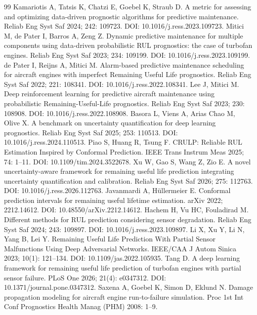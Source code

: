 \begin{thebibliography}{99}
\small
\setlength{\itemsep}{0pt}
 Kamariotis A, Tatsis K, Chatzi E, Goebel K, Straub D. A metric for assessing and optimizing data-driven prognostic algorithms for predictive maintenance. Reliab Eng Syst Saf 2024; 242: 109723. DOI: 10.1016/j.ress.2023.109723.
 Mitici M, de Pater I, Barros A, Zeng Z. Dynamic predictive maintenance for multiple components using data-driven probabilistic RUL prognostics: the case of turbofan engines. Reliab Eng Syst Saf 2023; 234: 109199. DOI: 10.1016/j.ress.2023.109199.
 de Pater I, Reijns A, Mitici M. Alarm-based predictive maintenance scheduling for aircraft engines with imperfect Remaining Useful Life prognostics. Reliab Eng Syst Saf 2022; 221: 108341. DOI: 10.1016/j.ress.2022.108341.
 Lee J, Mitici M. Deep reinforcement learning for predictive aircraft maintenance using probabilistic Remaining-Useful-Life prognostics. Reliab Eng Syst Saf 2023; 230: 108908. DOI: 10.1016/j.ress.2022.108908.
 Basora L, Viens A, Arias Chao M, Olive X. A benchmark on uncertainty quantification for deep learning prognostics. Reliab Eng Syst Saf 2025; 253: 110513. DOI: 10.1016/j.ress.2024.110513.
 Piao S, Huang R, Tsung F. CRULP: Reliable RUL Estimation Inspired by Conformal Prediction. IEEE Trans Instrum Meas 2025; 74: 1--11. DOI: 10.1109/tim.2024.3522678.
 Xu W, Gao S, Wang Z, Zio E. A novel uncertainty-aware framework for remaining useful life prediction integrating uncertainty quantification and calibration. Reliab Eng Syst Saf 2026; 275: 112763. DOI: 10.1016/j.ress.2026.112763.
 Javanmardi A, H\"ullermeier E. Conformal prediction intervals for remaining useful lifetime estimation. arXiv 2022; 2212.14612. DOI: 10.48550/arXiv.2212.14612.
 Hachem H, Vu HC, Fouladirad M. Different methods for RUL prediction considering sensor degradation. Reliab Eng Syst Saf 2024; 243: 109897. DOI: 10.1016/j.ress.2023.109897.
 Li X, Xu Y, Li N, Yang B, Lei Y. Remaining Useful Life Prediction With Partial Sensor Malfunctions Using Deep Adversarial Networks. IEEE/CAA J Autom Sinica 2023; 10(1): 121--134. DOI: 10.1109/jas.2022.105935.
 Tang D. A deep learning framework for remaining useful life prediction of turbofan engines with partial sensor failure. PLoS One 2026; 21(4): e0347312. DOI: 10.1371/journal.pone.0347312.
 Saxena A, Goebel K, Simon D, Eklund N. Damage propagation modeling for aircraft engine run-to-failure simulation. Proc 1st Int Conf Prognostics Health Manag (PHM) 2008: 1--9.

\end{thebibliography}
